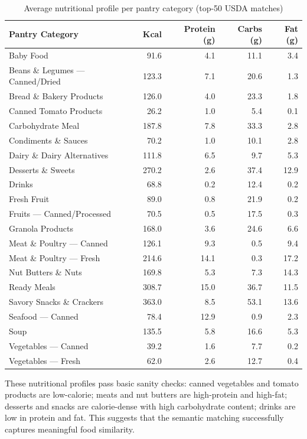 \begin{table}[h]
\centering
\caption{Average nutritional profile per pantry category (top-50 USDA matches)}
\label{tab:task2nutrition_full}
\small
\begin{tabular}{lrrrr}
\toprule
Pantry Category & Kcal & Protein (g) & Carbs (g) & Fat (g) \\
\midrule
Baby Food & 91.6 & 4.1 & 11.1 & 3.4 \\
Beans \& Legumes --- Canned/Dried & 123.3 & 7.1 & 20.6 & 1.3 \\
Bread \& Bakery Products & 126.0 & 4.0 & 23.3 & 1.8 \\
Canned Tomato Products & 26.2 & 1.0 & 5.4 & 0.1 \\
Carbohydrate Meal & 187.8 & 7.8 & 33.3 & 2.8 \\
Condiments \& Sauces & 70.2 & 1.0 & 10.1 & 2.8 \\
Dairy \& Dairy Alternatives & 111.8 & 6.5 & 9.7 & 5.3 \\
Desserts \& Sweets & 270.2 & 2.6 & 37.4 & 12.9 \\
Drinks & 68.8 & 0.2 & 12.4 & 0.2 \\
Fresh Fruit & 89.0 & 0.8 & 21.9 & 0.2 \\
Fruits --- Canned/Processed & 70.5 & 0.5 & 17.5 & 0.3 \\
Granola Products & 168.0 & 3.6 & 24.6 & 6.6 \\
Meat \& Poultry --- Canned & 126.1 & 9.3 & 0.5 & 9.4 \\
Meat \& Poultry --- Fresh & 214.6 & 14.1 & 0.3 & 17.2 \\
Nut Butters \& Nuts & 169.8 & 5.3 & 7.3 & 14.3 \\
Ready Meals & 308.7 & 15.0 & 36.7 & 11.5 \\
Savory Snacks \& Crackers & 363.0 & 8.5 & 53.1 & 13.6 \\
Seafood --- Canned & 78.4 & 12.9 & 0.9 & 2.3 \\
Soup & 135.5 & 5.8 & 16.6 & 5.3 \\
Vegetables --- Canned & 39.2 & 1.6 & 7.7 & 0.2 \\
Vegetables --- Fresh & 62.0 & 2.6 & 12.7 & 0.4 \\
\bottomrule
\end{tabular}
\end{table}

These nutritional profiles pass basic sanity checks: canned vegetables and tomato products are low-calorie; meats and nut butters are high-protein and high-fat; desserts and snacks are calorie-dense with high carbohydrate content; drinks are low in protein and fat. This suggests that the semantic matching successfully captures meaningful food similarity.

